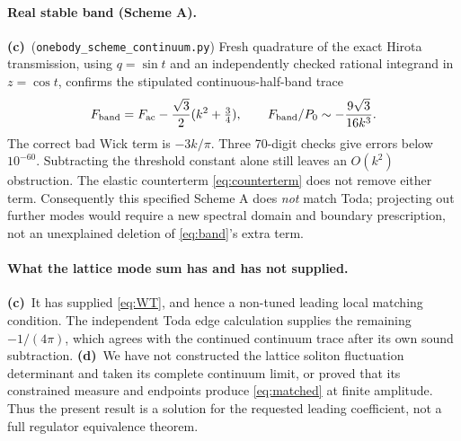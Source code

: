 \documentclass[11pt,a4paper]{article}
\newcommand{\Lc}{\textbf{(c)}\ }
\newcommand{\Ld}{\textbf{(d)}\ }
\newcommand{\ccheck}{\texttt{onebody\_\allowbreak scheme\_\allowbreak continuum.py}}
\begin{document}
\paragraph{Real stable band (Scheme A).}
\Lc (\ccheck) Fresh quadrature of the exact Hirota transmission, using
$q=\sin t$ and an independently checked rational integrand in $z=\cos t$,
confirms the stipulated continuous-half-band trace
\begin{equation}\label{eq:band}
 F_{\rm band}=F_{\rm ac}-\frac{\sqrt3}{2}(k^2+\tfrac34),\qquad
 F_{\rm band}/P_0\sim-\frac{9\sqrt3}{16k^3}.
\end{equation}
The correct bad Wick term is $-3k/\pi$. Three 70-digit checks give errors
below $10^{-60}$. Subtracting the threshold constant alone still leaves an
$O(k^2)$ obstruction. The elastic counterterm \eqref{eq:counterterm}
does not remove either term. Consequently this specified Scheme A does
\emph{not} match Toda; projecting out further modes would require a new
spectral domain and boundary prescription, not an unexplained deletion
of \eqref{eq:band}'s extra term.

\paragraph{What the lattice mode sum has and has not supplied.}
\Lc It has supplied \eqref{eq:WT}, and hence a non-tuned leading local
matching condition. The independent Toda edge calculation supplies the
remaining $-1/(4\pi)$, which agrees with the continued continuum trace
after its own sound subtraction. \Ld We have not constructed the lattice
soliton fluctuation determinant and taken its complete continuum limit,
or proved that its constrained measure and endpoints produce
\eqref{eq:matched} at finite amplitude. Thus the present result is a
solution for the requested leading coefficient, not a full regulator
equivalence theorem.
\end{document}
